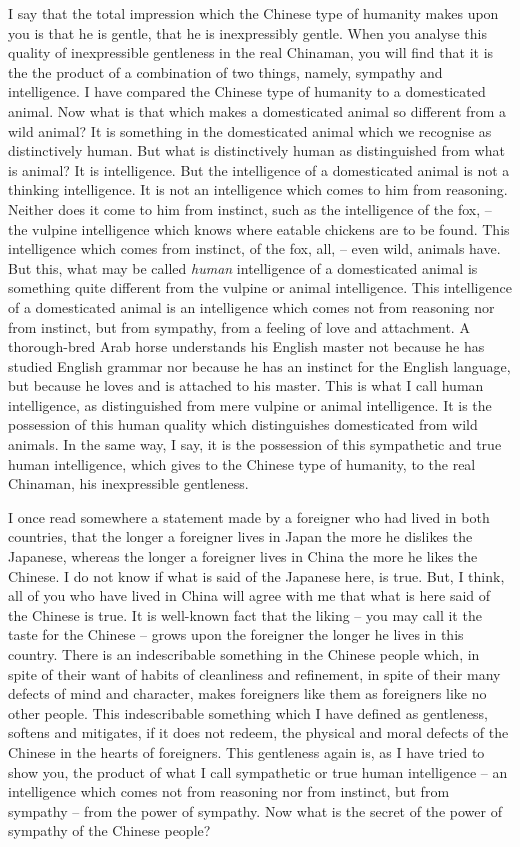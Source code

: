 I say that the total impression which the Chinese type of humanity makes upon you is that he is gentle, that he is inexpressibly gentle.
When you analyse this quality of inexpressible gentleness in the real Chinaman, you will find that it is the the product of a combination of two things, namely, sympathy and intelligence.
I have compared the Chinese type of humanity to a domesticated animal. Now what is that which makes a domesticated animal so different from a wild animal?
It is something in the domesticated animal which we recognise as distinctively human.
But what is distinctively human as distinguished from what is animal?
It is intelligence.
But the intelligence of a domesticated animal is not a thinking intelligence.
It is not an intelligence which comes to him from reasoning.
Neither does it come to him from instinct, such as the intelligence of the fox,
-- the vulpine intelligence which knows where eatable chickens are to be found. This intelligence which comes from instinct, of the fox, all, -- even wild, animals have.
But this, what may be called \emph{human} intelligence of a domesticated animal is something quite different from the vulpine or animal intelligence.
This intelligence of a domesticated animal is an intelligence which comes not from reasoning nor from instinct, but from sympathy, from a feeling of love and attachment.
A thorough-bred Arab horse understands his English master not because he has studied English grammar nor because he has an instinct for the English language, but because he loves and is attached to his master.
This is what I call human intelligence, as distinguished from mere vulpine or animal intelligence.
It is the possession of this human quality which distinguishes domesticated from wild animals.
In the same way, I say, it is the possession of this sympathetic and true human intelligence, which gives to the Chinese type of humanity,
to the real Chinaman, his inexpressible gentleness.

I once read somewhere a statement made by a foreigner who had lived in both countries, that the longer a foreigner lives in Japan the more he dislikes the Japanese, whereas the longer a foreigner lives in China the more he likes the Chinese.
I do not know if what is said of the Japanese here, is true.
But, I think, all of you who have lived in China will agree with me that what is here said of the Chinese is true.
It is well-known fact that the liking -- you may call it the taste for the Chinese -- grows upon the foreigner the longer he lives in this country.
There is an indescribable something in the Chinese people which, in spite of their want of habits of cleanliness and refinement, in spite of their many defects of mind and character, makes foreigners like them as foreigners like no other people.
This indescribable something which I have defined as gentleness, softens and mitigates, if it does not redeem, the physical and moral defects of the Chinese in the hearts of foreigners.
This gentleness again is, as I have tried to show you, the product of what I call sympathetic or true human intelligence -- an intelligence which comes not from reasoning nor from instinct, but from sympathy -- from the power of sympathy.
Now what is the secret of the power of sympathy of the Chinese people?

